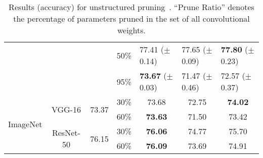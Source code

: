 \begin{table}[!htbp]
{\begin{tabular}{c|c|ccccc}
                                               &                                  &                                    & 50\%        & \multicolumn{1}{l}{77.41 ($\pm$0.14)}       & \multicolumn{1}{l}{77.65 ($\pm$0.09)}       & \multicolumn{1}{l}{\textbf{77.80} ($\pm$0.23)}                        \\                                       &                                  &                                    & 95\%        & \multicolumn{1}{l}{\textbf{73.67} ($\pm$0.03)}       & \multicolumn{1}{l}{71.47 ($\pm$0.46)}       & \multicolumn{1}{l}{72.57 ($\pm$0.37)}                        \\ \hline
\multirow{4}{*}{ImageNet}      
& \multirow{2}{*}{VGG-16}          & \multirow{2}{*}{73.37}             & 30\%        & \multicolumn{1}{c}{73.68}                        & \multicolumn{1}{c}{72.75}                        & \multicolumn{1}{c}{\textbf{74.02}}                        \\ 
                                              &                                  &                                    & 60\%        & \multicolumn{1}{c}{\textbf{73.63}}                        & \multicolumn{1}{c}{71.50}                        & \multicolumn{1}{c}{73.42}                        \\
                                              \cline{2-7} 
                                               & \multirow{2}{*}{ResNet-50}       & \multirow{2}{*}{76.15}             & 30\%            & \multicolumn{1}{c}{\textbf{76.06}}                        & \multicolumn{1}{c}{74.77}                        & \multicolumn{1}{c}{75.70}                        \\
                                              &                                  &                                    &    60\%         & \multicolumn{1}{c}{\textbf{76.09}}                        & \multicolumn{1}{c}{73.69}                        & \multicolumn{1}{c}{74.91}                        \\
                                               \hline
\end{tabular}
}
\caption{Results (accuracy) for unstructured pruning~\cite{han2015learning}. ``Prune Ratio'' denotes the percentage of parameters pruned in the set of all convolutional weights. }
\label{weight-level}
\end{table}

